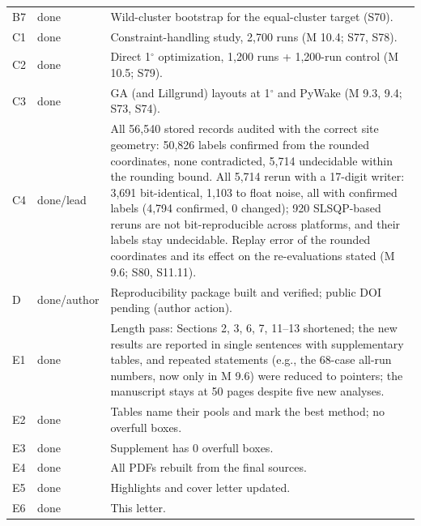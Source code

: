 \documentclass[11pt,a4paper]{article}
\begin{document}
\begin{longtable}{>{\raggedright\arraybackslash}p{}>{\raggedright\arraybackslash}p{}>{\raggedright\arraybackslash}p{}}
B7 & done & Wild-cluster bootstrap for the equal-cluster target (S70). \\
C1 & done & Constraint-handling study, 2,700 runs (M 10.4; S77, S78). \\
C2 & done & Direct 1$^\circ$ optimization, 1,200 runs + 1,200-run control (M 10.5; S79). \\
C3 & done & GA (and Lillgrund) layouts at 1$^\circ$ and PyWake (M 9.3, 9.4; S73, S74). \\
C4 & done/lead & All 56,540 stored records audited with the correct site geometry: 50,826 labels confirmed from the rounded coordinates, none contradicted, 5,714 undecidable within the rounding bound. All 5,714 rerun with a 17-digit writer: 3,691 bit-identical, 1,103 to float noise, all with confirmed labels (4,794 confirmed, 0 changed); 920 SLSQP-based reruns are not bit-reproducible across platforms, and their labels stay undecidable. Replay error of the rounded coordinates and its effect on the re-evaluations stated (M 9.6; S80, S11.11). \\
D & done/author & Reproducibility package built and verified; public DOI pending (author action). \\
E1 & done & Length pass: Sections 2, 3, 6, 7, 11--13 shortened; the new results are reported in single sentences with supplementary tables, and repeated statements (e.g., the 68-case all-run numbers, now only in M 9.6) were reduced to pointers; the manuscript stays at 50 pages despite five new analyses. \\
E2 & done & Tables name their pools and mark the best method; no overfull boxes. \\
E3 & done & Supplement has 0 overfull boxes. \\
E4 & done & All PDFs rebuilt from the final sources. \\
E5 & done & Highlights and cover letter updated. \\
E6 & done & This letter. \\
\bottomrule
\end{longtable}
\end{document}

